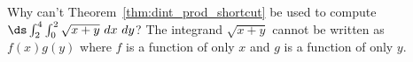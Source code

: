 {Why can't Theorem~\ref{thm:dint_prod_shortcut} be used to compute $\ds \int_2^4 \int_0^2 \sqrt{x+y}\ dx\ dy$?
}
{The integrand $\sqrt{x+y}$ cannot be written as $f(x)g(y)$ where $f$ is a function of only $x$ and $g$ is a function of only $y$.
}
